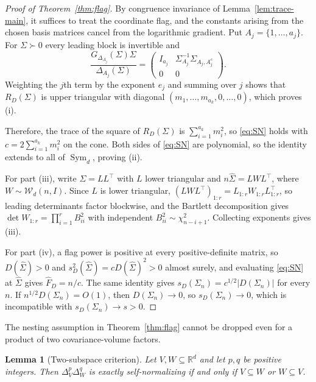 \documentclass[12pt,a4paper]{article}
\theoremstyle{plain}
\newtheorem{lemma}{Lemma}
\theoremstyle{definition}
\newcommand{\R}{\mathbb{R}}
\newcommand{\Sym}{\operatorname{Sym}}
\newcommand{\Sighat}{\hat{\Sigma}}
\newcommand{\FD}{\widehat{F}_D}
\begin{document}
\begin{proof}[Proof of Theorem~\ref{thm:flag}]
    By congruence invariance of Lemma~\ref{lem:trace-main}, it suffices to treat the coordinate flag, and the constants arising from the chosen basis matrices cancel from the logarithmic gradient.
    Put $A_j=\{1,\ldots,a_j\}$.
    For $\Sigma\succ0$ every leading block is invertible and
    \begin{equation*}
        \frac{G_{\Delta_{A_j}}(\Sigma)\Sigma}{\Delta_{A_j}(\Sigma)}
        =
        \begin{pmatrix}
        I_{a_j}&\Sigma_{A_j}^{-1}\Sigma_{A_j,A_j^c}\\
        0&0
        \end{pmatrix}
        .
    \end{equation*}
    Weighting the $j$th term by the exponent $e_j$ and summing over $j$ shows that $R_D(\Sigma)$ is upper triangular with diagonal $(m_1,\ldots,m_{a_k},0,\ldots,0)$, which proves (i).

    Therefore, the trace of the square of $R_D(\Sigma)$ is $\sum_{i=1}^{a_k}m_i^2$, so \eqref{eq:SN} holds with $c=2\sum_{i=1}^{a_k}m_i^2$ on the cone.
    Both sides of \eqref{eq:SN} are polynomial, so the identity extends to all of $\Sym_d$, proving (ii).

    For part (iii), write $\Sigma=LL^\top$ with $L$ lower triangular and $n\Sighat=LWL^\top$, where $W\sim\mathcal{W}_{d}(n,I)$.
    Since $L$ is lower triangular, $(LWL^\top)_{1:r}=L_{1:r}W_{1:r}L_{1:r}^\top$, so leading determinants factor blockwise, and the Bartlett decomposition \citep[Ch.~3]{muirhead1982} gives $\det W_{1:r}=\prod_{i=1}^r B_{ii}^2$ with independent $B_{ii}^2\sim\chi^2_{n-i+1}$.
    Collecting exponents gives (iii).
   
    For part (iv), a flag power is positive at every positive-definite matrix, so $D(\Sighat)>0$ and $s_D^2(\Sighat)=cD(\Sighat)^2>0$ almost surely, and evaluating \eqref{eq:SN} at $\Sighat$ gives $\FD=n/c$.
    The same identity gives $s_D(\Sigma_n)=c^{1/2}|D(\Sigma_n)|$ for every $n$.
    If $n^{1/2}D(\Sigma_n)=O(1)$, then $D(\Sigma_n)\to0$, so $s_D(\Sigma_n)\to0$, which is incompatible with $s_D(\Sigma_n)\to s>0$.
\end{proof}

The nesting assumption in Theorem~\ref{thm:flag} cannot be dropped even for a product of two covariance-volume factors.

\begin{lemma}[Two-subspace criterion]
\label{lem:two-subspace}
    Let $V,W\subseteq\R^d$ and let $p,q$ be positive integers.
    Then $\Delta_V^p\Delta_W^q$ is exactly self-normalizing if and only if $V\subseteq W$ or $W\subseteq V$.
\end{lemma}
\end{document}
